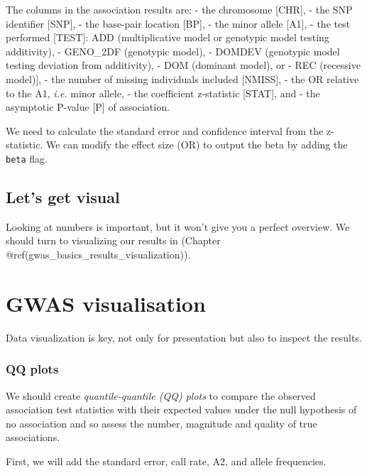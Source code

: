 \documentclass[
]{book}
\begin{document}
The columns in the association results are:
- the chromosome {[}CHR{]},
- the SNP identifier {[}SNP{]},
- the base-pair location {[}BP{]},
- the minor allele {[}A1{]},
- the test performed {[}TEST{]}: ADD (multiplicative model or genotypic model testing additivity),
- GENO\_2DF (genotypic model),
- DOMDEV (genotypic model testing deviation from additivity),
- DOM (dominant model), or
- REC (recessive model){]},
- the number of missing individuals included {[}NMISS{]},
- the OR relative to the A1, \emph{i.e.} minor allele,
- the coefficient z-statistic {[}STAT{]}, and
- the asymptotic P-value {[}P{]} of association.

We need to calculate the standard error and confidence interval from the z-statistic. We can modify the effect size (OR) to output the beta by adding the \texttt{beta} flag.

\hypertarget{lets-get-visual}{%
\section{Let's get visual}\label{lets-get-visual}}

Looking at numbers is important, but it won't give you a perfect overview. We should turn to visualizing our results in (Chapter @ref(gwas\_basics\_results\_visualization)).

\hypertarget{gwas-visualisation}{%
\chapter{GWAS visualisation}\label{gwas-visualisation}}

Data visualization is key, not only for presentation but also to inspect the results.

\hypertarget{qq-plots}{%
\subsection{QQ plots}\label{qq-plots}}

We should create \emph{quantile-quantile (QQ) plots} to compare the observed association test statistics with their expected values under the null hypothesis of no association and so assess the number, magnitude and quality of true associations.

First, we will add the standard error, call rate, A2, and allele frequencies.
\end{document}
